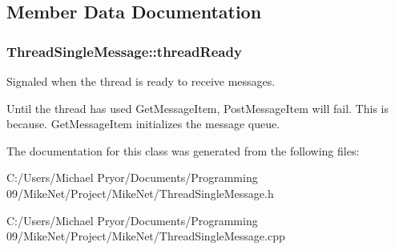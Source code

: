 \subsection{Member Data Documentation}
\hypertarget{class_thread_single_message_ae120ad936311a2c422789a8a5b3d7304}{
\subsubsection[{threadReady}]{ {\bf ThreadSingleMessage::threadReady}}}
\label{class_thread_single_message_ae120ad936311a2c422789a8a5b3d7304}


Signaled when the thread is ready to receive messages. 

Until the thread has used GetMessageItem, PostMessageItem will fail. This is because. GetMessageItem initializes the message queue. 

The documentation for this class was generated from the following files:\begin{DoxyCompactItemize}
\item 
C:/Users/Michael Pryor/Documents/Programming 09/MikeNet/Project/MikeNet/ThreadSingleMessage.h\item 
C:/Users/Michael Pryor/Documents/Programming 09/MikeNet/Project/MikeNet/ThreadSingleMessage.cpp\end{DoxyCompactItemize}
